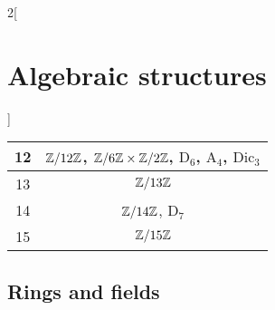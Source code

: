 \documentclass[../../../main_math.tex]{subfiles}
\begin{document}
\begin{multicols}{2}[\section{Algebraic structures}]
\begin{center}
\begin{tabular}{|c|c|}
      \hline
      12    & $\quot{\ZZ}{12\ZZ}$, $\quot{\ZZ}{6\ZZ}\times\quot{\ZZ}{2\ZZ}$, $\text{D}_6$, $\text{A}_4$, $\text{Dic}_3$                   \\
      \hline
      13    & $\quot{\ZZ}{13\ZZ}$                                                                                                         \\
      \hline
      14    & $\quot{\ZZ}{14\ZZ}$, $\text{D}_7$                                                                                           \\
      \hline
      15    & $\quot{\ZZ}{15\ZZ}$                                                                                                         \\
      \hline
    \end{tabular}
  \end{center}
  \subsection{Rings and fields}\label{AS_R}

\end{multicols}
\end{document}
